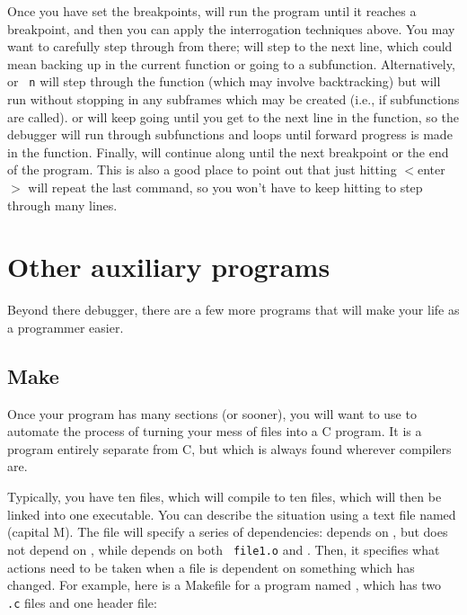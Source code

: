 \documentclass[12pt]{article}
\begin{document}
Once you have set the breakpoints,  will run the program until it
reaches a breakpoint, and then you can apply the interrogation techniques
above. You may want to carefully step through from there; 
will step to the next line, which could mean backing up in the current
function or going to a subfunction. Alternatively,  or {\tt
n} will step through the function (which may involve backtracking) but
will run without stopping in any subframes which may be created
(i.e., if subfunctions are called).   or  will keep
going until you get to the next line in the function, so the debugger
will run through subfunctions and loops until forward progress is made
in the function.  Finally,  will continue along until the next
breakpoint or the end of the program. This is also a good place to
point out that just hitting $<$enter$>$ will repeat the last command,
so you won't have to keep hitting  to step through many lines.


\section{Other auxiliary programs} Beyond there debugger, there
are a few more programs that will make your life as a programmer easier.

\subsection{Make} \label{make} 
Once your program has many sections (or sooner), you will want to use
 to automate the process of turning your mess of files into
a C program.  It is a program entirely separate from C, but which
is always found wherever compilers are.

Typically, you have ten  files, which will compile
to ten  files, which will then be linked into one executable.
You can describe the situation using a
text file named  (capital M). The file will specify a
series of dependencies:  depends on , but does
not depend on , while  depends on both {\tt
file1.o} and .  Then, it specifies what actions need to be taken
when a file is dependent on something which has changed.  For example,
here is a Makefile for a program named , which has two {\tt
.c} files and one header file:
\end{document}
